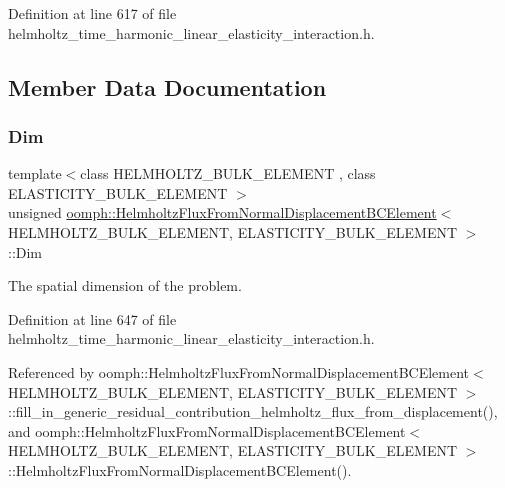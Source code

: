 Definition at line 617 of file helmholtz\+\_\+time\+\_\+harmonic\+\_\+linear\+\_\+elasticity\+\_\+interaction.\+h.



\subsection{Member Data Documentation}
\mbox{\label{classoomph_1_1HelmholtzFluxFromNormalDisplacementBCElement_a72d189d7598def4ce0ce2aecdc93bcd9}} 
\subsubsection{\texorpdfstring{Dim}{Dim}}
{\footnotesize\ttfamily template$<$class H\+E\+L\+M\+H\+O\+L\+T\+Z\+\_\+\+B\+U\+L\+K\+\_\+\+E\+L\+E\+M\+E\+NT , class E\+L\+A\+S\+T\+I\+C\+I\+T\+Y\+\_\+\+B\+U\+L\+K\+\_\+\+E\+L\+E\+M\+E\+NT $>$ \\
unsigned \hyperlink{classoomph_1_1HelmholtzFluxFromNormalDisplacementBCElement}{oomph\+::\+Helmholtz\+Flux\+From\+Normal\+Displacement\+B\+C\+Element}$<$ H\+E\+L\+M\+H\+O\+L\+T\+Z\+\_\+\+B\+U\+L\+K\+\_\+\+E\+L\+E\+M\+E\+NT, E\+L\+A\+S\+T\+I\+C\+I\+T\+Y\+\_\+\+B\+U\+L\+K\+\_\+\+E\+L\+E\+M\+E\+NT $>$\+::Dim\hspace{0.3cm}{\ttfamily [private]}}



The spatial dimension of the problem. 



Definition at line 647 of file helmholtz\+\_\+time\+\_\+harmonic\+\_\+linear\+\_\+elasticity\+\_\+interaction.\+h.



Referenced by oomph\+::\+Helmholtz\+Flux\+From\+Normal\+Displacement\+B\+C\+Element$<$ H\+E\+L\+M\+H\+O\+L\+T\+Z\+\_\+\+B\+U\+L\+K\+\_\+\+E\+L\+E\+M\+E\+N\+T, E\+L\+A\+S\+T\+I\+C\+I\+T\+Y\+\_\+\+B\+U\+L\+K\+\_\+\+E\+L\+E\+M\+E\+N\+T $>$\+::fill\+\_\+in\+\_\+generic\+\_\+residual\+\_\+contribution\+\_\+helmholtz\+\_\+flux\+\_\+from\+\_\+displacement(), and oomph\+::\+Helmholtz\+Flux\+From\+Normal\+Displacement\+B\+C\+Element$<$ H\+E\+L\+M\+H\+O\+L\+T\+Z\+\_\+\+B\+U\+L\+K\+\_\+\+E\+L\+E\+M\+E\+N\+T, E\+L\+A\+S\+T\+I\+C\+I\+T\+Y\+\_\+\+B\+U\+L\+K\+\_\+\+E\+L\+E\+M\+E\+N\+T $>$\+::\+Helmholtz\+Flux\+From\+Normal\+Displacement\+B\+C\+Element().

